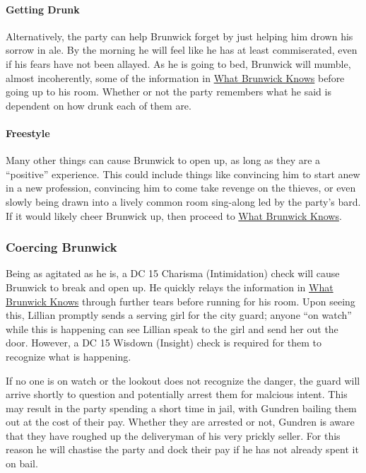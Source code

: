 \documentclass[10pt,twocolumn,openany,nodeprecatedcode,bg=none,inline]{dndbook}
\begin{document}
\paragraph{Getting Drunk}
Alternatively, the party can help Brunwick forget by just helping him drown his sorrow in ale.
By the morning he will feel like he has at least commiserated, even if his fears have not been allayed.
As he is going to bed, Brunwick will mumble, almost incoherently, some of the information in \hyperref[sec:brunwickKnows]{What Brunwick Knows} before going up to his room.
Whether or not the party remembers what he said is dependent on how drunk each of them are.

\paragraph{Freestyle}
Many other things can cause Brunwick to open up, as long as they are a ``positive'' experience.
This could include things like convincing him to start anew in a new profession, convincing him to come take revenge on the thieves, or even slowly being drawn into a lively common room sing-along led by the party's bard.
If it would likely cheer Brunwick up, then proceed to \hyperref[sec:brunwickKnows]{What Brunwick Knows}.

\subsubsection{Coercing Brunwick}
Being as agitated as he is, a DC 15 Charisma (Intimidation) check will cause Brunwick to break and open up.
He quickly relays the information in \hyperref[sec:brunwickKnows]{What Brunwick Knows} through further tears before running for his room.
Upon seeing this, Lillian promptly sends a serving girl for the city guard; anyone ``on watch'' while this is happening can see Lillian speak to the girl and send her out the door.
However, a DC 15 Wisdown (Insight) check is required for them to recognize what is happening.

If no one is on watch or the lookout does not recognize the danger, the guard will arrive shortly to question and potentially arrest them for malcious intent.
This may result in the party spending a short time in jail, with Gundren bailing them out at the cost of their pay.
Whether they are arrested or not, Gundren is aware that they have roughed up the deliveryman of his very prickly seller.
For this reason he will chastise the party and dock their pay if he has not already spent it on bail.
\end{document}
